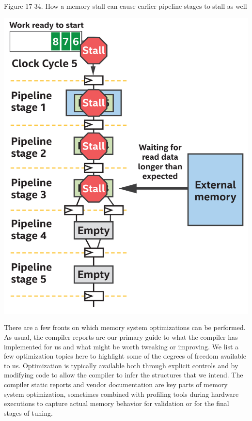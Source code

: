 \hspace*{\fill} \par %
Figure 17-34. How a memory stall can cause earlier pipeline stages to stall as well
\begin{center}
	\includegraphics[width=1.0\textwidth]{content/chapter-17/images/26}
\end{center}

There are a few fronts on which memory system optimizations can be performed. As usual, the compiler reports are our primary guide to what the compiler has implemented for us and what might be worth tweaking or improving. We list a few optimization topics here to highlight some of the degrees of freedom available to us. Optimization is typically available both through explicit controls and by modifying code to allow the compiler to infer the structures that we intend. The compiler static reports and vendor documentation are key parts of memory system optimization, sometimes combined with profiling tools during hardware executions to capture actual memory behavior for validation or for the final stages of tuning.\par

